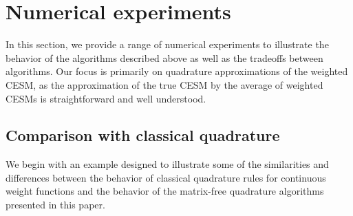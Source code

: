 \section{Numerical experiments}

\label{sec:numerical_experiments}

In this section, we provide a range of numerical experiments to illustrate the behavior of the algorithms described above as well as the tradeoffs between algorithms.
Our focus is primarily on quadrature approximations of the weighted CESM, as the approximation of the true CESM by the average of weighted CESMs is straightforward and well understood.




\subsection{Comparison with classical quadrature}

We begin with an example designed to illustrate some of the similarities and differences between the behavior of classical quadrature rules for continuous weight functions and the behavior of the matrix-free quadrature algorithms presented in this paper. 

